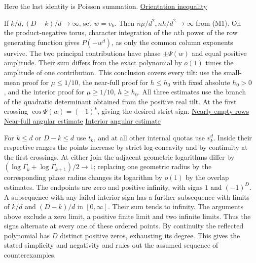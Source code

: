 Here the last identity is Poisson summation. \href{https://github.com/ProgramComputer/open-math-research/blob/f7e10f84dd21fec44ca58c60bae0879d12ebd89b/topics/balanced-arrays/orientation-normalization.md}{Orientation inequality}

If $k/d,(D-k)/d\to\infty$, set $w=v_k$. Then $n\mu/d^2,nh/d^2\to\infty$ from (M1). On the product-negative torus, character integration of the $n$th power of the row generating function gives $P(-w^d)$, as only the common column exponents survive. The two principal contributions have phase $\pm\Psi(w)$ and equal positive amplitude. Their sum differs from the exact polynomial by $o(1)$ times the amplitude of one contribution. This conclusion covers every tilt: use the small-mean proof for $\mu\le1/10$, the near-full proof for $h\le h_0$ with fixed absolute $h_0>0$, and the interior proof for $\mu\ge1/10$, $h\ge h_0$. All three estimates use the branch of the quadratic determinant obtained from the positive real tilt. At the first crossing $\cos\Psi(w)=(-1)^k$, giving the desired strict sign. \hyperref[sec:nearly-empty]{Nearly empty rows} \enspace \hyperref[sec:growing-cap-upper-saddle]{Near-full angular estimate} \enspace \hyperref[sec:interior-saddle]{Interior angular estimate}

For $k\le d$ or $D-k\le d$ use $t_k$, and at all other internal quotas use $v_k^d$. Inside their respective ranges the points increase by strict log-concavity and by continuity at the first crossings. At either join the adjacent geometric logarithms differ by $(\log\Gamma_k+\log\Gamma_{k+1})/2\to1$; replacing one geometric radius by the corresponding phase radius changes its logarithm by $o(1)$ by the overlap estimates. The endpoints are zero and positive infinity, with signs $1$ and $(-1)^D$. A subsequence with any failed interior sign has a further subsequence with limits of $k/d$ and $(D-k)/d$ in $[0,\infty]$. Their sum tends to infinity. The arguments above exclude a zero limit, a positive finite limit and two infinite limits. Thus the signs alternate at every one of these ordered points. By continuity the reflected polynomial has $D$ distinct positive zeros, exhausting its degree. This gives the stated simplicity and negativity and rules out the assumed sequence of counterexamples.
